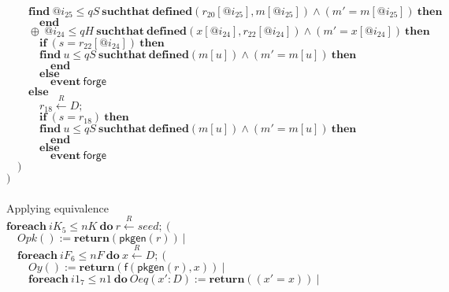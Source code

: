 \documentclass{article}
\newcommand{\store}{\leftarrow}
\newcommand{\getR}{\stackrel{R}{\store}}
\newcommand{\kw}[1]{\mathbf{#1}}
\newcommand{\kwf}[1]{\mathsf{#1}}
\newcommand{\var}[1]{\mathit{#1}}
\newcommand{\kwt}[1]{\mathit{#1}}
\newcommand{\kwp}[1]{\mathit{#1}}
\begin{document}
\begin{tabbing}
$\quad \quad \kw{find}\ \var{@i}_{25} \leq \kwp{qS}\ \kw{suchthat}\ \kw{defined}(\var{r}_{20}[\var{@i}_{25}], \var{m}[\var{@i}_{25}])\wedge (\var{m'}  =  \var{m}[\var{@i}_{25}])\ \kw{then}$\\
$\quad \quad \quad \kw{end}$\\
$\quad \quad \oplus\ \var{@i}_{24} \leq \kwp{qH}\ \kw{suchthat}\ \kw{defined}(\var{x}[\var{@i}_{24}], \var{r}_{22}[\var{@i}_{24}])\wedge (\var{m'}  =  \var{x}[\var{@i}_{24}])\ \kw{then}$\\
$\quad \quad \quad \kw{if}\ (\var{s}  =  \var{r}_{22}[\var{@i}_{24}])\ \kw{then}$\\
$\quad \quad \quad \kw{find}\ \var{u} \leq \kwp{qS}\ \kw{suchthat}\ \kw{defined}(\var{m}[\var{u}])\wedge (\var{m'}  =  \var{m}[\var{u}])\ \kw{then}$\\
$\quad \quad \quad \quad \kw{end}$\\
$\quad \quad \quad \kw{else}$\\
$\quad \quad \quad \quad \kw{event}\ \kwf{forge}$\\
$\quad \quad \kw{else}$\\
$\quad \quad \quad \var{r}_{18} \getR \kwt{D};$\\
$\quad \quad \quad \kw{if}\ (\var{s}  =  \var{r}_{18})\ \kw{then}$\\
$\quad \quad \quad \kw{find}\ \var{u} \leq \kwp{qS}\ \kw{suchthat}\ \kw{defined}(\var{m}[\var{u}])\wedge (\var{m'}  =  \var{m}[\var{u}])\ \kw{then}$\\
$\quad \quad \quad \quad \kw{end}$\\
$\quad \quad \quad \kw{else}$\\
$\quad \quad \quad \quad \kw{event}\ \kwf{forge}$\\
$\quad )$\\
$)$\\
$ $\\
\\
Applying equivalence\\
$\kw{foreach}\ \var{iK}_{5} \leq \kwp{nK}\ \kw{do}\ \var{r} \getR seed;\ ($\\
$\quad  Opk() := \kw{return}(\kwf{pkgen}(\var{r}))\ |$\\
$\quad  \kw{foreach}\ \var{iF}_{6} \leq \kwp{nF}\ \kw{do}\ \var{x} \getR D;\ ($\\
$\quad  \quad Oy() := \kw{return}(\kwf{f}(\kwf{pkgen}(\var{r}), \var{x}))\ |$\\
$\quad  \quad \kw{foreach}\ \var{i1}_{7} \leq \kwp{n1}\ \kw{do}\ Oeq(\var{x'}: \kwt{D}) := \kw{return}((\var{x'}  =  \var{x}))\ |$\\

\end{tabbing}
\end{document}
